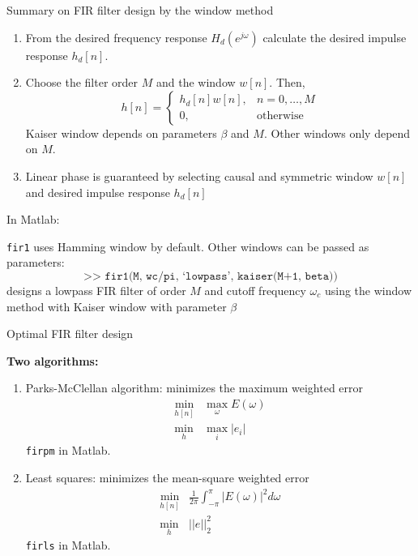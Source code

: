 \documentclass[10pt, aspectratio=169]{beamer}
\begin{document}
%
\begin{frame}{Summary on FIR filter design by the window method}
\begin{enumerate}
	\item From the desired frequency response $H_d(e^{j\omega})$ calculate the desired impulse response $h_d[n]$.
	\item Choose the filter order $M$ and the window $w[n]$. Then,
	\begin{equation*}
	h[n] = \begin{cases}
	h_d[n]w[n], & n = 0, \ldots, M \\
	0, &\text{otherwise}
	\end{cases}
	\end{equation*}
	Kaiser window depends on parameters $\beta$ and $M$. Other windows only depend on $M$.
	
	\item Linear phase is guaranteed by selecting causal and symmetric window $w[n]$ and desired impulse response $h_d[n]$
\end{enumerate}

In Matlab: 

\texttt{fir1} uses Hamming window by default. Other windows can be passed as parameters:
\begin{equation*}
\texttt{>> fir1(M, wc/pi, `lowpass', kaiser(M+1, beta))}
\end{equation*} 
designs a lowpass FIR filter of order $M$ and cutoff frequency $\omega_c$ using the window method with Kaiser window with parameter $\beta$
\end{frame}

%
\begin{frame}{Optimal FIR filter design}

\textbf{Two algorithms:}
\begin{enumerate}
	\item Parks-McClellan algorithm: minimizes the maximum weighted error 
	\begin{align*}
	\min_{h[n]} &\max_\omega E(\omega) \tag{min-max problem} \\
	\min_{h} &\max_i |e_i| \tag{in matrix notation}
	\end{align*}
	\texttt{firpm} in Matlab.
	\item Least squares: minimizes the mean-square weighted error 
	\begin{align*}
	\min_{h[n]} &\frac{1}{2\pi}\int_{-\pi}^{\pi} |E(\omega)|^2d\omega \tag{least squares}\\
	\min_{h} &||e||_2^2 \tag{in matrix notation}
	\end{align*}
	\texttt{firls} in Matlab.
\end{enumerate}
\end{frame}
\end{document}
